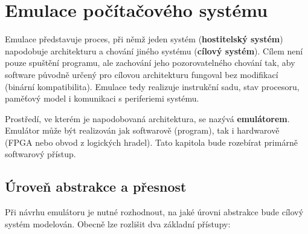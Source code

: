 \chapter{Emulace počítačového systému}

Emulace představuje proces, při němž jeden systém (\textbf{hostitelský systém}) napodobuje
architekturu a chování jiného systému (\textbf{cílový systém}). Cílem není pouze spuštění
programu, ale zachování jeho pozorovatelného chování tak, aby software původně určený pro cílovou
architekturu fungoval bez modifikací (binární kompatibilita). Emulace tedy realizuje instrukční
sadu, stav procesoru, paměťový model i komunikaci s periferiemi systému.

Prostředí, ve kterém je napodobovaná architektura, se
nazývá \textbf{emulátorem}. Emulátor může být realizován jak softwarově (program), tak i hardwarově
(FPGA nebo obvod z logických hradel). Tato kapitola bude rozebírat primárně softwarový přístup.

%
%

\section{Úroveň abstrakce a přesnost}

Při návrhu emulátoru je nutné rozhodnout, na jaké úrovni abstrakce bude cílový systém modelován.
Obecně lze rozlišit dva základní přístupy:\cite{emu-wiki-hle-lle}

